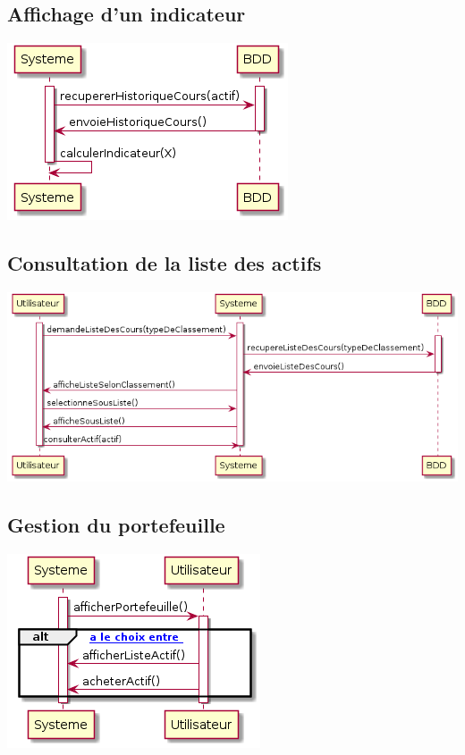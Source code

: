 \subsection{Affichage d'un indicateur}
\includegraphics[scale=0.5]{../graph/DiagrammeSequenceCalculerIndicateur.png} \\

\subsection{Consultation de la liste des actifs}
\includegraphics[scale=0.5]{../graph/DiagrammeSequenceConsulterListeActifs.png} \\

\subsection{Gestion du portefeuille}
\includegraphics[scale=0.5]{../graph/DiagrammeSequenceGererPortefeuille.png} \\

